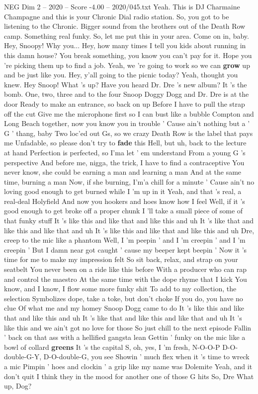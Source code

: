 \begin{textsample}{NEG Dim 2 – 2020 – Score -4.00 – 2020/045.txt}  \label{ex:f2_neg_021}
Yeah.
This is DJ Charmaine Champagne and this is your Chronic Dial radio station.
So, you got to be listening to the Chronic.
Bigger sound from the brothers out of the Death Row camp.
Something real funky.
So, let me put this in your area.
Come on in, baby.
Hey, Snoopy!
Why you...
Hey, how many times I tell you kids about running in this damn house?
You break something, you know you can't pay for it.
Hope you 're picking them up to find a job.
Yeah, we 're going to work so we can \textbf{grow} up and be just like you.
Hey, y'all going to the picnic today?
Yeah, thought you knew.
Hey Snoop!
What 's up?
Have you heard Dr.
Dre 's new album?
It 's the bomb.
One, two, three and to the four Snoop Doggy Dogg and Dr.
Dre is at the door Ready to make an entrance, so back on up Before I have to pull the strap off the cut Give me the microphone first so I can bust like a bubble Compton and Long Beach together, now you know you in trouble ' Cause ain't nothing but a ' G ' thang, baby Two loc'ed out Gs, so we crazy Death Row is the label that pays me Unfadable, so please don't try to \textbf{fade} this Hell, but uh, back to the lecture at hand Perfection is perfected, so I'ma let ' em understand From a young G 's perspective And before me, nigga, the trick, I have to find a contraceptive You never know, she could be earning a man and learning a man And at the same time, burning a man Now, if she burning, I'm'a chill for a minute ' Cause ain't no loving good enough to get burned while I 'm up in it Yeah, and that 's real, a real-deal Holyfield And now you hookers and hoes know how I feel Well, if it 's good enough to get broke off a proper chunk I 'll take a small piece of some of that funky stuff It 's like this and like that and like this and uh It 's like that and like this and like that and uh It 's like this and like that and like this and uh Dre, creep to the mic like a phantom Well, I 'm peepin ' and I 'm creepin ' and I 'm creepin ' But I damn near got caught ' cause my beeper kept beepin ' Now it 's time for me to make my impression felt So sit back, relax, and strap on your seatbelt You never been on a ride like this before With a producer who can rap and control the maestro At the same time with the dope rhyme that I kick You know, and I know, I flow some more funky shit To add to my collection, the selection Symbolizes dope, take a toke, but don't choke If you do, you have no clue Of what me and my homey Snoop Dogg came to do It 's like this and like that and like this and uh It 's like that and like this and like that and uh It 's like this and we ain't got no love for those So just chill to the next episode Fallin ' back on that ass with a hellified gangsta lean Gettin ' funky on the mic like a bowl of collard \textbf{greens} It 's the capital S, oh, yes, I 'm fresh, N-O-O-P D-O-double-G-Y, D-O-double-G, you see Showin ' much flex when it 's time to wreck a mic Pimpin ' hoes and clockin ' a grip like my name was Dolemite Yeah, and it don't quit I think they in the mood for another one of those G hits So, Dre What up, Dog?

\end{textsample}
